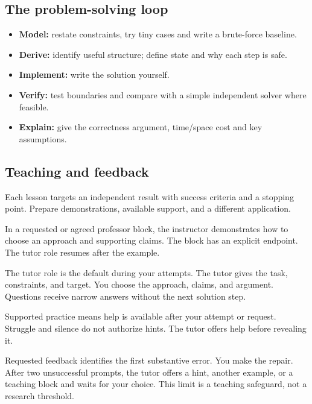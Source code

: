 \documentclass[11pt,letterpaper]{article}
\begin{document}
\subsection*{The problem-solving loop}

\begin{itemize}

\item \textbf{Model:} restate constraints, try tiny cases and write a brute-force baseline.

\item \textbf{Derive:} identify useful structure; define state and why each step is safe.

\item \textbf{Implement:} write the solution yourself.

\item \textbf{Verify:} test boundaries and compare with a simple independent solver where feasible.

\item \textbf{Explain:} give the correctness argument, time/space cost and key assumptions.

\end{itemize}

\subsection*{Teaching and feedback}

Each lesson targets an independent result with success criteria and a stopping point. Prepare demonstrations, available support, and a different application.

In a requested or agreed professor block, the instructor demonstrates how to choose an approach and supporting claims. The block has an explicit endpoint. The tutor role resumes after the example.

The tutor role is the default during your attempts. The tutor gives the task, constraints, and target. You choose the approach, claims, and argument. Questions receive narrow answers without the next solution step.

Supported practice means help is available after your attempt or request. Struggle and silence do not authorize hints. The tutor offers help before revealing it.

Requested feedback identifies the first substantive error. You make the repair. After two unsuccessful prompts, the tutor offers a hint, another example, or a teaching block and waits for your choice. This limit is a teaching safeguard, not a research threshold.
\end{document}
